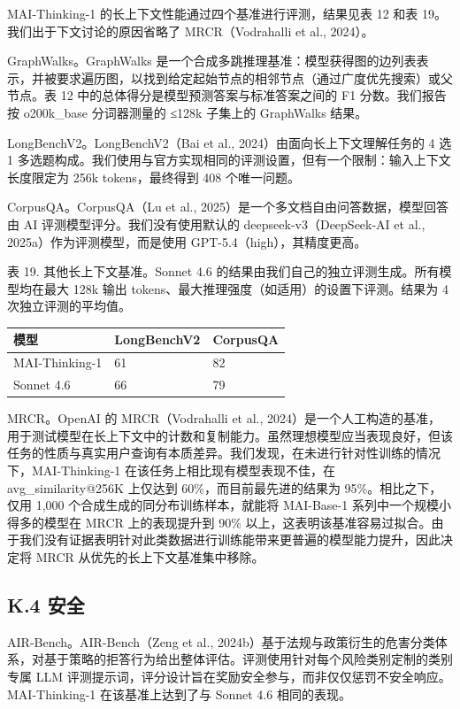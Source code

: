 MAI-Thinking-1 的长上下文性能通过四个基准进行评测，结果见表 12 和表 19。我们出于下文讨论的原因省略了 MRCR（Vodrahalli et al., 2024）。

GraphWalks。GraphWalks 是一个合成多跳推理基准：模型获得图的边列表表示，并被要求遍历图，以找到给定起始节点的相邻节点（通过广度优先搜索）或父节点。表 12 中的总体得分是模型预测答案与标准答案之间的 F1 分数。我们报告按 o200k\_base 分词器测量的 ≤128k 子集上的 GraphWalks 结果。

LongBenchV2。LongBenchV2（Bai et al., 2024）由面向长上下文理解任务的 4 选 1 多选题构成。我们使用与官方实现相同的评测设置，但有一个限制：输入上下文长度限定为 256k tokens，最终得到 408 个唯一问题。

CorpusQA。CorpusQA（Lu et al., 2025）是一个多文档自由问答数据，模型回答由 AI 评测模型评分。我们没有使用默认的 deepseek-v3（DeepSeek-AI et al., 2025a）作为评测模型，而是使用 GPT-5.4（high），其精度更高。

表 19. 其他长上下文基准。Sonnet 4.6 的结果由我们自己的独立评测生成。所有模型均在最大 128k 输出 tokens、最大推理强度（如适用）的设置下评测。结果为 4 次独立评测的平均值。

{\def\LTcaptype{none} %
\begin{longtable}[]{@{}|l|l|l|@{}}
\toprule\noalign{}
\endhead
\bottomrule\noalign{}
\endlastfoot
\hline
模型 & LongBenchV2 & CorpusQA \\
\hline
MAI-Thinking-1 & 61 & 82 \\
\hline
Sonnet 4.6 & 66 & 79 \\
\hline
\end{longtable}
}

MRCR。OpenAI 的 MRCR（Vodrahalli et al., 2024）是一个人工构造的基准，用于测试模型在长上下文中的计数和复制能力。虽然理想模型应当表现良好，但该任务的性质与真实用户查询有本质差异。我们发现，在未进行针对性训练的情况下，MAI-Thinking-1 在该任务上相比现有模型表现不佳，在 avg\_similarity@256K 上仅达到 60\%，而目前最先进的结果为 95\%。相比之下，仅用 1,000 个合成生成的同分布训练样本，就能将 MAI-Base-1 系列中一个规模小得多的模型在 MRCR 上的表现提升到 90\% 以上，这表明该基准容易过拟合。由于我们没有证据表明针对此类数据进行训练能带来更普遍的模型能力提升，因此决定将 MRCR 从优先的长上下文基准集中移除。

\subsection{K.4 安全}\label{k.4-safety}

AIR‐Bench。AIR-Bench（Zeng et al., 2024b）基于法规与政策衍生的危害分类体系，对基于策略的拒答行为给出整体评估。评测使用针对每个风险类别定制的类别专属 LLM 评测提示词，评分设计旨在奖励安全参与，而非仅仅惩罚不安全响应。MAI-Thinking-1 在该基准上达到了与 Sonnet 4.6 相同的表现。

